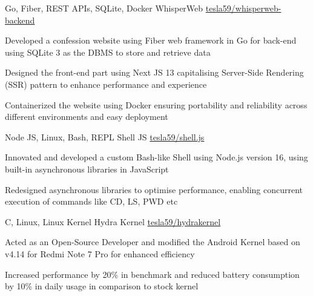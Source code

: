 \documentclass[]{awesome-cv}
\begin{document}
\begin{cventries}
    \cventry
    {Go, Fiber, REST APIs, SQLite, Docker}
    {WhisperWeb}
    {\href{https://github.com/tesla59/whisperweb-backend}{tesla59/whisperweb-backend}}
    {}
    {\begin{cvitems}
            \item Developed a confession website using Fiber web framework in Go for back-end using SQLite 3 as the DBMS to store and retrieve data
            \item Designed the front-end part using Next JS 13 capitalising Server-Side Rendering (SSR) pattern to enhance performance and experience
            \item Containerized the website using Docker ensuring portability and reliability across different environments and easy deployment
        \end{cvitems}}
    \vspace{-5mm}
    \cventry
    {Node JS, Linux, Bash, REPL}
    {Shell JS}
    {\href{https://github.com/tesla59/shell.js}{tesla59/shell.js}}
    {}
    {\begin{cvitems}
            \item Innovated and developed a custom Bash-like Shell using Node.js version 16, using built-in asynchronous libraries in JavaScript
            \item Redesigned asynchronous libraries to optimise performance, enabling concurrent execution of commands like CD, LS, PWD etc
        \end{cvitems}}
    \vspace{-5mm}
    \cventry
    {C, Linux, Linux Kernel}
    {Hydra Kernel}
    {\href{https://github.com/tesla59/hydra_kernel}{tesla59/hydra\textunderscore{}kernel}}
    {}
    {\begin{cvitems}
            \item Acted as an Open-Source Developer and modified the Android Kernel based on v4.14 for Redmi Note 7 Pro for enhanced efficiency
            \item Increased performance by 20\% in benchmark and reduced battery consumption by 10\% in daily usage in comparison to stock kernel
        \end{cvitems}}
    \vspace{-3mm}
\end{cventries}
\end{document}
